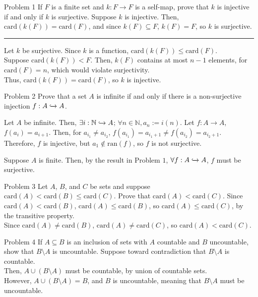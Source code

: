 \documentclass[10pt]{extarticle}
\title{}
\author{Avinash Iyer}
\date{}
\begin{document}
  \begin{problem}{Problem 1}
    If $F$ is a finite set and $k:F\rightarrow F$ is a self-map, prove that $k$ is injective if and only if $k$ is surjective.
    \tcblower
    Suppose $k$ is injective. Then, $\text{card}(k(F)) = \text{card}(F)$, and since $k(F) \subseteq F$, $k(F) = F$, so $k$ is surjective.
    \rule{\textwidth}{0.4pt}
    Let $k$ be surjective. Since $k$ is a function, $\text{card}(k(F))\leq \text{card}(F)$.\\

    Suppose $\text{card}(k(F)) < F$. Then, $k(F)$ contains at most $n-1$ elements, for $\text{card}(F) = n$, which would violate surjectivity.\\

    Thus, $\text{card}(k(F)) = \text{card}(F)$, so $k$ is injective.
  \end{problem}
  \begin{problem}{Problem 2}
    Prove that a set $A$ is infinite if and only if there is a non-surjective injection $f:A\xhookrightarrow{} A$.
    \tcblower
    \begin{description}[font=\normalfont]
      \item[$(\Rightarrow)$] Let $A$ be infinite. Then, $\exists i: \mathbb{N}\xhookrightarrow{} A$; $\forall n\in \mathbb{N}, a_n:=i(n)$. Let $f: A\rightarrow A$, $f(a_i) = a_{i+1}$. Then, for $a_{i_1} \neq a_{i_2}$, $f(a_{i_1}) = a_{i_1 + 1} \neq f(a_{i_2}) = a_{i_2 + 1}$. Therefore, $f$ is injective, but $a_1\notin\text{ran}(f)$, so $f$ is not surjective.
      \item[$(\Leftarrow)$] Suppose $A$ is finite. Then, by the result in Problem $1$, $\forall f: A\xhookrightarrow{} A$, $f$ must be surjective.
    \end{description}
  \end{problem}
  \begin{problem}{Problem 3}
    Let $A$, $B$, and $C$ be sets and suppose $\textrm{card}(A) < \textrm{card}(B) \leq \textrm{card}(C)$. Prove that $\textrm{card}(A) < \textrm{card}(C)$.
    \tcblower
    Since $\text{card}(A) < \text{card}(B)$, $\text{card}(A) \leq \text{card}(B)$, so $\text{card}(A) \leq \text{card}(C)$, by the transitive property.\\

    Since $\text{card}(A) \neq \text{card}(B)$, $\text{card}(A) \neq \text{card}(C)$, so $\text{card}(A) < \text{card}(C)$.
  \end{problem}
  \begin{problem}{Problem 4}
    If $A\subseteq B$ is an inclusion of sets with $A$ countable and $B$ uncountable, show that $B\setminus A$ is uncountable.
    \tcblower
    Suppose toward contradiction that $B\setminus A$ is countable.\\

    Then, $A\cup (B\setminus A)$ must be countable, by union of countable sets.\\

    However, $A\cup (B\setminus A) = B$, and $B$ is uncountable, meaning that $B\setminus A$ must be uncountable.
  \end{problem}
\end{document}
